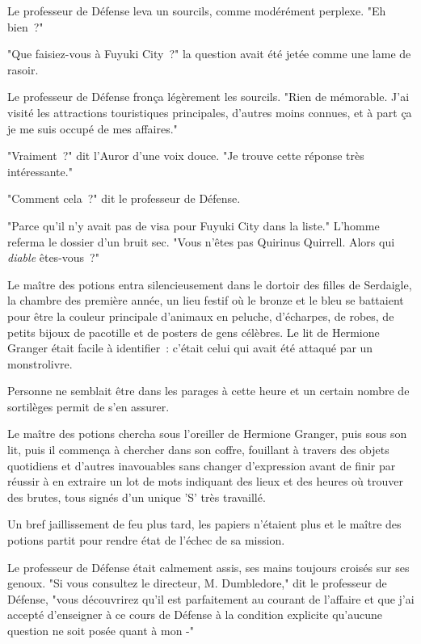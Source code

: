 Le professeur de Défense leva un sourcils, comme modérément perplexe. "Eh bien~?"

"Que faisiez-vous à Fuyuki City~?" la question avait été jetée comme une lame de rasoir.

Le professeur de Défense fronça légèrement les sourcils. "Rien de mémorable. J'ai visité les attractions touristiques principales, d'autres moins connues, et à part ça je me suis occupé de mes affaires."

"Vraiment~?" dit l'Auror d'une voix douce. "Je trouve cette réponse très intéressante."

"Comment cela~?" dit le professeur de Défense.

"Parce qu'il n'y avait pas de visa pour Fuyuki City dans la liste." L'homme referma le dossier d'un bruit sec. "Vous n'êtes pas Quirinus Quirrell. Alors qui \emph{diable} êtes-vous~?"

\later

Le maître des potions entra silencieusement dans le dortoir des filles de Serdaigle, la chambre des première année, un lieu festif où le bronze et le bleu se battaient pour être la couleur principale d'animaux en peluche, d'écharpes, de robes, de petits bijoux de pacotille et de posters de gens célèbres. Le lit de Hermione Granger était facile à identifier~: c'était celui qui avait été attaqué par un monstrolivre.

Personne ne semblait être dans les parages à cette heure et un certain nombre de sortilèges permit de s'en assurer.

Le maître des potions chercha sous l'oreiller de Hermione Granger, puis sous son lit, puis il commença à chercher dans son coffre, fouillant à travers des objets quotidiens et d'autres inavouables sans changer d'expression avant de finir par réussir à en extraire un lot de mots indiquant des lieux et des heures où trouver des brutes, tous signés d'un unique 'S' très travaillé.

Un bref jaillissement de feu plus tard, les papiers n'étaient plus et le maître des potions partit pour rendre état de l'échec de sa mission.

\later

Le professeur de Défense était calmement assis, ses mains toujours croisés sur ses genoux. "Si vous consultez le directeur, M. Dumbledore," dit le professeur de Défense, "vous découvrirez qu'il est parfaitement au courant de l'affaire et que j'ai accepté d'enseigner à ce cours de Défense à la condition explicite qu'aucune question ne soit posée quant à mon -"

